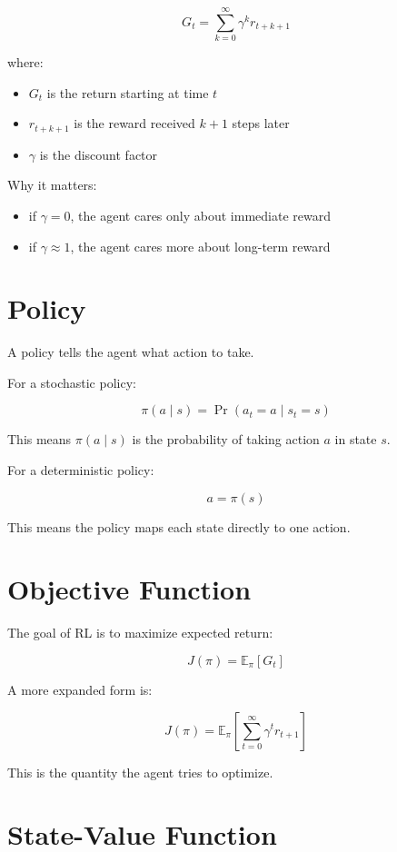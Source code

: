 \documentclass[11pt]{article}
\begin{document}
\[
G_t = \sum_{k=0}^{\infty} \gamma^k r_{t+k+1}
\]

where:
\begin{itemize}
    \item $G_t$ is the return starting at time $t$
    \item $r_{t+k+1}$ is the reward received $k+1$ steps later
    \item $\gamma$ is the discount factor
\end{itemize}

Why it matters:
\begin{itemize}
    \item if $\gamma = 0$, the agent cares only about immediate reward
    \item if $\gamma \approx 1$, the agent cares more about long-term reward
\end{itemize}

\section{Policy}

A policy tells the agent what action to take.

For a stochastic policy:

\[
\pi(a \mid s) = \Pr(a_t = a \mid s_t = s)
\]

This means $\pi(a \mid s)$ is the probability of taking action $a$ in state $s$.

For a deterministic policy:

\[
a = \pi(s)
\]

This means the policy maps each state directly to one action.

\section{Objective Function}

The goal of RL is to maximize expected return:

\[
J(\pi) = \mathbb{E}_{\pi}[G_t]
\]

A more expanded form is:

\[
J(\pi) = \mathbb{E}_{\pi}\left[\sum_{t=0}^{\infty} \gamma^t r_{t+1}\right]
\]

This is the quantity the agent tries to optimize.

\section{State-Value Function}
\end{document}
